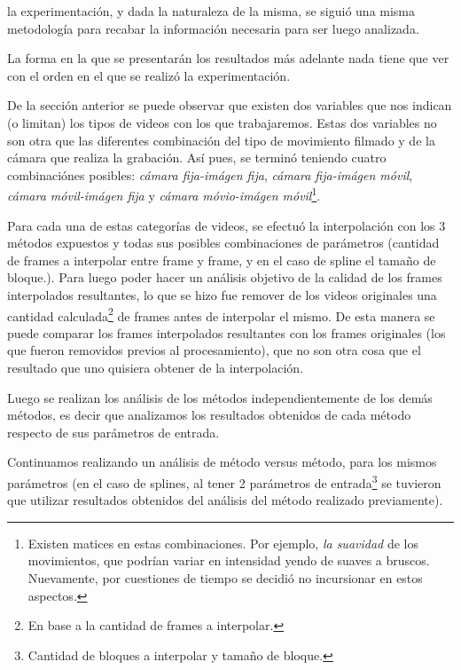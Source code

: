  la experimentaci\'on, y dada la naturaleza de la misma,
se sigui\'o una misma metodolog\'ia para recabar la informaci\'on necesaria para
ser luego analizada.

\par La forma en la que se presentar\'an los resultados m\'as adelante nada
tiene que ver con el orden en el que se realiz\'o la experimentaci\'on.

\par De la secci\'on anterior se puede observar que existen dos variables que
nos indican (o limitan) los tipos de videos con los que trabajaremos. Estas dos
variables no son otra que las diferentes combinaci\'on del tipo de movimiento
filmado y de la c\'amara que realiza la grabaci\'on. As\'i pues, se termin\'o
teniendo cuatro combinaci\'ones posibles: \emph{c\'amara fija-im\'agen fija},
\emph{c\'amara fija-im\'agen m\'ovil}, \emph{c\'amara m\'ovil-im\'agen fija} y
\emph{c\'amara m\'ovio-im\'agen m\'ovil}\footnote{Existen matices en estas
combinaciones. Por ejemplo, \emph{la suavidad} de los movimientos, que podr\'ian
variar en intensidad yendo de suaves a bruscos. Nuevamente, por cuestiones de
tiempo se decidi\'o no incursionar en estos aspectos.}.

\par Para cada una de estas categor\'ias de videos, se efectu\'o la
interpolaci\'on con los 3 m\'etodos expuestos y todas sus posibles combinaciones
de par\'ametros (cantidad de frames a interpolar entre frame y frame, y en el
caso de spline el tama\~no de bloque.). Para luego poder hacer un an\'alisis
objetivo de la calidad de los frames interpolados resultantes, lo que se hizo
fue remover de los videos originales una cantidad calculada\footnote{En base
a la cantidad de frames a interpolar.} de frames antes de interpolar el mismo.
De esta manera se puede comparar los frames interpolados resultantes con los
frames originales (los que fueron removidos previos al procesamiento), que no
son otra cosa que el resultado que uno quisiera obtener de la interpolaci\'on.

\par Luego se realizan los an\'alisis de los m\'etodos independientemente de los
dem\'as m\'etodos, es decir que analizamos los resultados obtenidos de cada
m\'etodo respecto de sus par\'ametros de entrada.

\par Continuamos realizando un an\'alisis de m\'etodo versus m\'etodo, para
los mismos par\'ametros (en el caso de splines, al tener 2 par\'ametros de
entrada\footnote{Cantidad de bloques a interpolar y tama\~no de bloque.} se
tuvieron que utilizar resultados obtenidos del an\'alisis del m\'etodo
realizado previamente).

